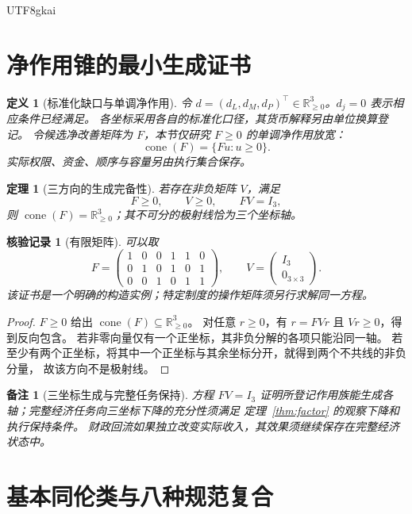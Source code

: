 \documentclass[12pt,a4paper,openany]{report}
\newtheorem{definition}{定义}[chapter]
\newtheorem{theorem}{定理}[chapter]
\newtheorem{remark}{备注}[chapter]
\newtheorem{Certificate}{核验记录}[chapter]
\numberwithin{equation}{chapter}
\newcommand{\RR}{\mathbb R}
\newcommand{\cone}{\operatorname{cone}}
\begin{document}
\begin{CJK*}{UTF8}{gkai}
\section{净作用锥的最小生成证书}

\begin{definition}[标准化缺口与单调净作用]
令 $d=(d_L,d_M,d_P)^\top\in\RR_{\ge0}^3$。$d_j=0$ 表示相应条件已经满足。
各坐标采用各自的标准化口径，其货币解释另由单位换算登记。
令候选净改善矩阵为 $F$，本节仅研究 $F\ge0$ 的单调净作用放宽：
\[
 \cone(F)=\{Fu:u\ge0\}.
\]
实际权限、资金、顺序与容量另由执行集合保存。
\end{definition}

\begin{theorem}[三方向的生成完备性]
\label{thm:three-cone}
若存在非负矩阵 $V$，满足
\[
 F\ge0,\qquad V\ge0,\qquad FV=I_3,
\]
则 $\cone(F)=\RR_{\ge0}^3$；其不可分的极射线恰为三个坐标轴。
\end{theorem}
\begin{Certificate}[有限矩阵]
可以取
\[
 F=
 \begin{pmatrix}
 1&0&0&1&1&0\\
 0&1&0&1&0&1\\
 0&0&1&0&1&1
 \end{pmatrix},
 \qquad
 V=\begin{pmatrix}I_3\\0_{3\times3}\end{pmatrix}.
\]
该证书是一个明确的构造实例；特定制度的操作矩阵须另行求解同一方程。
\end{Certificate}
\begin{proof}
$F\ge0$ 给出 $\cone(F)\subseteq\RR_{\ge0}^3$。
对任意 $r\ge0$，有 $r=FVr$ 且 $Vr\ge0$，得到反向包含。
若非零向量仅有一个正坐标，其非负分解的各项只能沿同一轴。
若至少有两个正坐标，将其中一个正坐标与其余坐标分开，就得到两个不共线的非负分量，
故该方向不是极射线。
\end{proof}

\begin{remark}[三坐标生成与完整任务保持]
方程 $FV=I_3$ 证明所登记作用族能生成各轴；完整经济任务向三坐标下降的充分性须满足
定理~\ref{thm:factor} 的观察下降和执行保持条件。
财政回流如果独立改变实际收入，其效果须继续保存在完整经济状态中。
\end{remark}

\section{基本同伦类与八种规范复合}


\end{CJK*}
\end{document}
